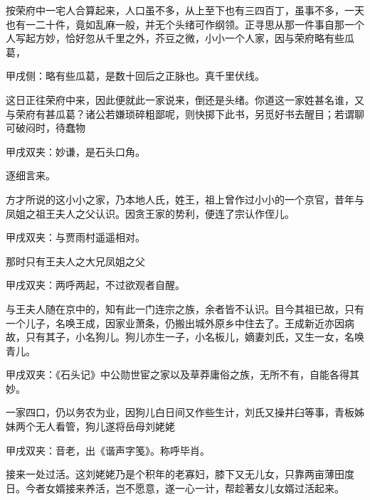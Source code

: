 \begin{parag}
    按荣府中一宅人合算起来，人口虽不多，从上至下也有三四百丁，虽事不多，一天也有一二十件，竟如乱麻一般，并无个头绪可作纲领。正寻思从那一件事自那一个人写起方妙，恰好忽从千里之外，芥豆之微，小小一个人家，因与荣府略有些瓜葛，\begin{note}甲戌侧：略有些瓜葛，是数十回后之正脉也。真千里伏线。 \end{note}这日正往荣府中来，因此便就此一家说来，倒还是头绪。你道这一家姓甚名谁，又与荣府有甚瓜葛？诸公若嫌琐碎粗鄙呢，则快掷下此书，另觅好书去醒目；若谓聊可破闷时，待蠢物\begin{note}甲戌双夹：妙谦，是石头口角。\end{note}逐细言来。
\end{parag}


\begin{parag}
    方才所说的这小小之家，乃本地人氏，姓王，祖上曾作过小小的一个京官，昔年与凤姐之祖王夫人之父认识。因贪王家的势利，便连了宗认作侄儿。\begin{note}甲戌双夹：与贾雨村遥遥相对。\end{note}那时只有王夫人之大兄凤姐之父\begin{note}甲戌双夹：两呼两起，不过欲观者自醒。\end{note}与王夫人随在京中的，知有此一门连宗之族，余者皆不认识。目今其祖已故，只有一个儿子，名唤王成，因家业萧条，仍搬出城外原乡中住去了。王成新近亦因病故，只有其子，小名狗儿。狗儿亦生一子，小名板儿，嫡妻刘氏，又生一女，名唤青儿。\begin{note}甲戌双夹：《石头记》中公勋世宦之家以及草莽庸俗之族，无所不有，自能各得其妙。\end{note}一家四口，仍以务农为业，因狗儿白日间又作些生计，刘氏又操井臼等事，青板姊妹两个无人看管，狗儿遂将岳母刘姥姥\begin{note}甲戌双夹：音老，出《谐声字笺》。称呼毕肖。\end{note}接来一处过活。这刘姥姥乃是个积年的老寡妇，膝下又无儿女，只靠两亩薄田度日。今者女婿接来养活，岂不愿意，遂一心一计，帮趁著女儿女婿过活起来。
\end{parag}



